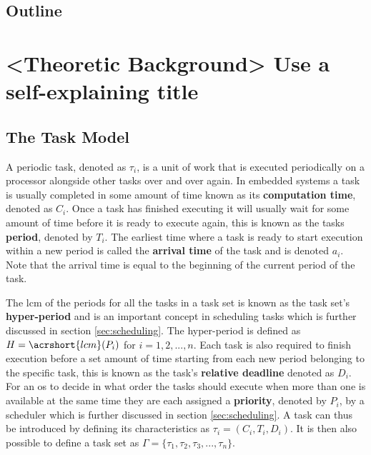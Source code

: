 \documentclass{kththesis}
\begin{document}
\section{Outline}



\chapter{<Theoretic Background> Use a self-explaining title}



\section{The Task Model} \label{sec:the_task_model}

A periodic task, denoted as $\tau_i$, is a unit of work that is executed periodically on a processor
alongside other tasks over and over again. In embedded systems a task is usually completed in some
amount of time known as its \textbf{computation time}, denoted as $C_i$. Once a task has finished
executing it will usually wait for some amount of time before it is ready to execute again, this is
known as the tasks \textbf{period}, denoted by $T_i$. The earliest time where a task is ready to
start execution within a new period is called the \textbf{arrival time} of the task and is denoted $
a_i $. Note that the arrival time is equal to the beginning of the current period of the task.

The \acrshort{lcm} of the periods for all the tasks in a task set is known as the task set's
\textbf{hyper-period} and is an important concept in scheduling tasks which is further discussed
in section \ref{sec:scheduling}. The hyper-period is defined as $H = \acrshort{lcm}(P_i)$ for $i =
1, 2, ..., n$. Each task is also required to finish execution before a set amount of time starting
from each new period belonging to the specific task, this is known as the task's \textbf{relative
deadline} denoted as $D_i$. For an \acrshort{os} to decide in what order the tasks should execute
when more than one is available at the same time they are each assigned a \textbf{priority}, denoted
by $P_i$, by a scheduler which is further discussed in section \ref{sec:scheduling}. A task can thus
be introduced by defining its characteristics as $\tau_i = (C_i, T_i, D_i)$. It is then also possible to
define a task set as $ \Gamma = \{\tau_1, \tau_2, \tau_3, ..., \tau_n\} $.
\end{document}
